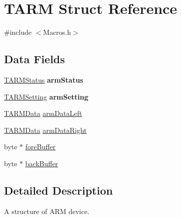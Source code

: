 \hypertarget{struct_t_a_r_m}{\section{T\-A\-R\-M Struct Reference}
\label{struct_t_a_r_m}
}


{\ttfamily \#include $<$Macros.\-h$>$}

\subsection*{Data Fields}
\begin{DoxyCompactItemize}
\item 
\hypertarget{struct_t_a_r_m_ae3a0b1bc845c945533d3fdeb577a3bff}{\hyperlink{struct_t_a_r_m_status}{T\-A\-R\-M\-Status} {\bfseries arm\-Status}}\label{struct_t_a_r_m_ae3a0b1bc845c945533d3fdeb577a3bff}

\item 
\hypertarget{struct_t_a_r_m_a88721c4faef935573df54fc2b3d00e44}{\hyperlink{struct_t_a_r_m_setting}{T\-A\-R\-M\-Setting} {\bfseries arm\-Setting}}\label{struct_t_a_r_m_a88721c4faef935573df54fc2b3d00e44}

\item 
\hyperlink{struct_t_a_r_m_data}{T\-A\-R\-M\-Data} \hyperlink{struct_t_a_r_m_a9b9175098c6243daf73d121cfed91cd0}{arm\-Data\-Left}
\item 
\hyperlink{struct_t_a_r_m_data}{T\-A\-R\-M\-Data} \hyperlink{struct_t_a_r_m_aab1bb5b43b99175e5d5e840f2f70173d}{arm\-Data\-Right}
\item 
byte $\ast$ \hyperlink{struct_t_a_r_m_a2e918fd14799cefe36a3d031b7098cb0}{fore\-Buffer}
\item 
byte $\ast$ \hyperlink{struct_t_a_r_m_adb38c4a2040af58a4fb2c54a642a8c69}{back\-Buffer}
\end{DoxyCompactItemize}


\subsection{Detailed Description}
A structure of A\-R\-M device. 

